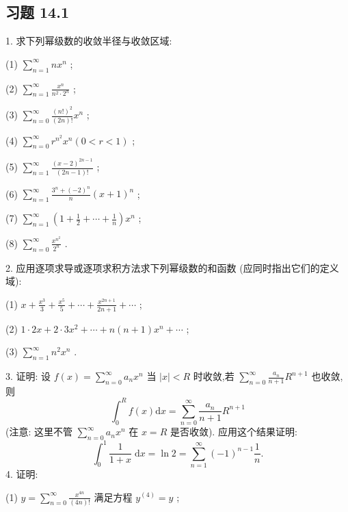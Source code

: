 \subsection{习题 14.1}

1. 求下列幂级数的收敛半径与收敛区域:

(1) \(\mathop{\sum }\limits_{{n = 1}}^{\infty }n{x}^{n}\) ;

(2) \(\mathop{\sum }\limits_{{n = 1}}^{\infty }\frac{{x}^{n}}{{n}^{2} \cdot  {2}^{n}}\) ;

(3) \(\mathop{\sum }\limits_{{n = 0}}^{\infty }\frac{{\left( n!\right) }^{2}}{\left( {2n}\right) !}{x}^{n}\) ;

(4) \(\mathop{\sum }\limits_{{n = 0}}^{\infty }{r}^{{n}^{2}}{x}^{n}\left( {0 < r < 1}\right)\) ;

(5) \(\mathop{\sum }\limits_{{n = 1}}^{\infty }\frac{{\left( x - 2\right) }^{{2n} - 1}}{\left( {{2n} - 1}\right) !}\) ;

(6) \(\mathop{\sum }\limits_{{n = 1}}^{\infty }\frac{{3}^{n} + {\left( -2\right) }^{n}}{n}{\left( x + 1\right) }^{n}\) ;

(7) \(\mathop{\sum }\limits_{{n = 1}}^{\infty }\left( {1 + \frac{1}{2} + \cdots  + \frac{1}{n}}\right) {x}^{n}\) ;

(8) \(\mathop{\sum }\limits_{{n = 0}}^{\infty }\frac{{x}^{{n}^{2}}}{{2}^{n}}\) .

2. 应用逐项求导或逐项求积方法求下列幂级数的和函数 (应同时指出它们的定义域):

(1) \(x + \frac{{x}^{3}}{3} + \frac{{x}^{5}}{5} + \cdots  + \frac{{x}^{{2n} + 1}}{{2n} + 1} + \cdots\) ;

(2) \(1 \cdot  {2x} + 2 \cdot  3{x}^{2} + \cdots  + n\left( {n + 1}\right) {x}^{n} + \cdots\) ;

(3) \(\mathop{\sum }\limits_{{n = 1}}^{\infty }{n}^{2}{x}^{n}\) .

3. 证明: 设 \(f\left( x\right)  = \mathop{\sum }\limits_{{n = 0}}^{\infty }{a}_{n}{x}^{n}\) 当 \(\left| x\right|  < R\) 时收敛,若 \(\mathop{\sum }\limits_{{n = 0}}^{\infty }\frac{{a}_{n}}{n + 1}{R}^{n + 1}\) 也收敛,则
\[
{\int }_{0}^{R}f\left( x\right) \mathrm{d}x = \mathop{\sum }\limits_{{n = 0}}^{\infty }\frac{{a}_{n}}{n + 1}{R}^{n + 1}
\]
(注意: 这里不管 \(\mathop{\sum }\limits_{{n = 0}}^{\infty }{a}_{n}{x}^{n}\) 在 \(x = R\) 是否收敛). 应用这个结果证明:
\[
{\int }_{0}^{1}\frac{1}{1 + x}\mathrm{\;d}x = \ln 2 = \mathop{\sum }\limits_{{n = 1}}^{\infty }{\left( -1\right) }^{n - 1}\frac{1}{n}.
\]
4. 证明:

(1) \(y = \mathop{\sum }\limits_{{n = 0}}^{\infty }\frac{{x}^{4n}}{\left( {4n}\right) !}\) 满足方程 \({y}^{\left( 4\right) } = y\) ;

